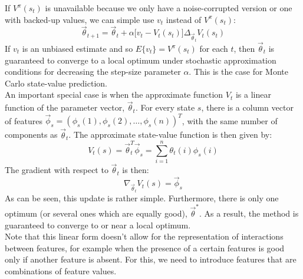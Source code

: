 \documentclass[a4paper, 11pt]{article}
\begin{document}
If $V^{\pi}(s_t)$ is unavailable because we only have a noise-corrupted version or one with backed-up values, we can simple use $v_t$ instead of $V^{\pi}(s_t)$:
\begin{equation}
\overrightarrow{\theta}_{t+1} = \overrightarrow{\theta}_t + \alpha \big[ v_t - V_t(s_t) \big] \Delta_{\overrightarrow{\theta}_t} V_t(s_t)
\end{equation}
If $v_t$ is an unbiased estimate and so $E\{v_t\} = V^{\pi}(s_t)$ for each $t$, then $\overrightarrow{\theta}_t$ is guaranteed to converge to a local optimum under stochastic approximation conditions for decreasing the step-size parameter $\alpha$. This is the case for Monte Carlo state-value prediction.\\

An important special case is when the approximate function $V_t$ is a linear function of the parameter vector, $\overrightarrow{\theta}_t$. For every state $s$, there is a column vector of features $\overrightarrow{\phi}_s = (\phi_s(1), \phi_s(2), \dots, \phi_s(n))^T$, with the same number of components as $\overrightarrow{\theta}_t$. The approximate state-value function is then given by:
\begin{equation}
V_t(s) = \overrightarrow{\theta}_t^T \overrightarrow{\phi}_s = \sum_{i=1}^n \theta_t(i) \phi_s(i)
\end{equation}
The gradient with respect to $\overrightarrow{\theta}_t$ is then:
\begin{equation}
\nabla_{\overrightarrow{\theta}_t} V_t(s) = \overrightarrow{\phi}_s
\end{equation}
As can be seen, this update is rather simple. Furthermore, there is only one optimum (or several ones which are equally good), $\overrightarrow{\theta}^{*}$. As a result, the method is guaranteed to converge to or near a local optimum.\\
Note that this linear form doesn't allow for the representation of interactions between features, for example when the presence of a certain features is good only if another feature is absent. For this, we need to introduce features that are combinations of feature values.\\
\end{document}
